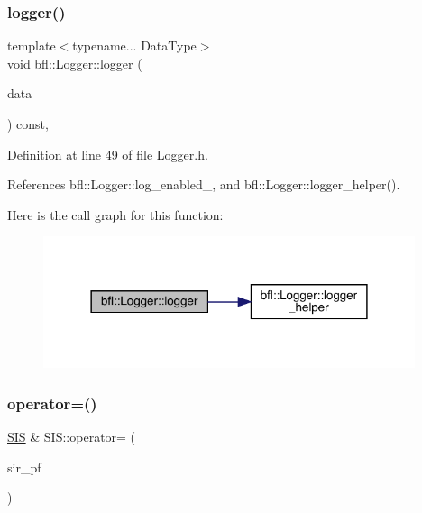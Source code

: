 \subsubsection{\texorpdfstring{logger()}{logger()}\hspace{0.1cm}{\footnotesize\ttfamily [4/4]}}
{\footnotesize\ttfamily template$<$typename... Data\+Type$>$ \\
void bfl\+::\+Logger\+::logger (\begin{DoxyParamCaption}\item[{Data\+Type...}]{data }\end{DoxyParamCaption}) const\hspace{0.3cm}{\ttfamily [inline]}, {\ttfamily [inherited]}}



Definition at line 49 of file Logger.\+h.



References bfl\+::\+Logger\+::log\+\_\+enabled\+\_\+, and bfl\+::\+Logger\+::logger\+\_\+helper().

Here is the call graph for this function\+:
\nopagebreak
\begin{figure}[H]
\begin{center}
\leavevmode
\includegraphics[width=309pt]{classbfl_1_1Logger_a0f0cf7ce956546d94dfb1feb7cebf171_cgraph}
\end{center}
\end{figure}
\mbox{\label{classbfl_1_1SIS_a32458a24446df8126ace63f21de2bf02}} 
\subsubsection{\texorpdfstring{operator=()}{operator=()}}
{\footnotesize\ttfamily \mbox{\hyperlink{classbfl_1_1SIS}{S\+IS}} \& S\+I\+S\+::operator= (\begin{DoxyParamCaption}\item[{\mbox{\hyperlink{classbfl_1_1SIS}{S\+IS}} \&\&}]{sir\+\_\+pf }\end{DoxyParamCaption})\hspace{0.3cm}{\ttfamily [noexcept]}}



